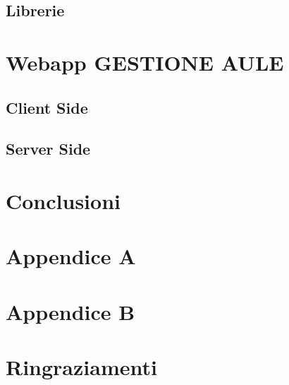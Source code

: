 \documentclass[a4paper,pt11,oneside]{book}
\begin{document}
\section{Librerie}


\chapter{Webapp GESTIONE AULE}


\section{Client Side}



\FloatBarrier





\section{Server Side}



\chapter{Conclusioni}


\chapter{Appendice A}

\chapter{Appendice B}


\chapter*{Ringraziamenti}
\end{document}
